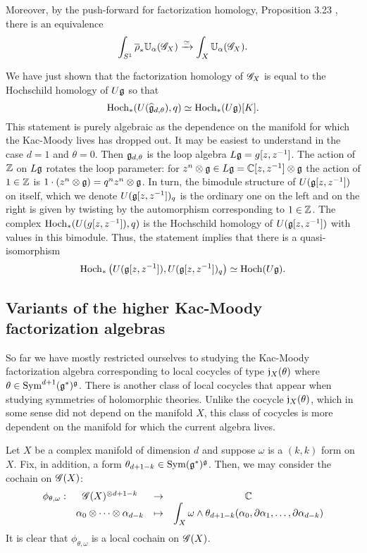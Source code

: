 \documentclass[10pt]{amsart}
\begin{document}
Moreover, by the push-forward for factorization homology, Proposition 3.23 \cite{AFTopMan}, there is an equivalence
\[
\int_{S^1} \overline{\rho}_* \mathbb U_\alpha(\mathscr G_X) \xrightarrow{\simeq} \int_X \mathbb U_{\alpha} (\mathscr G_X) .
\]

We have just shown that the factorization homology of $\mathscr G_X$ is equal to the Hochschild homology of $U\mathfrak g$ so that
\[
{\rm Hoch}_*(U(\widehat{\mathfrak g}_{d,\theta}), q) \simeq {\rm Hoch}_* (U\mathfrak g)[K] .
\]
This statement is purely algebraic as the dependence on the manifold for which the Kac-Moody lives has dropped out.
It may be easiest to understand in the case $d=1$ and $\theta = 0$. 
Then $\mathfrak g_{d,\theta}$ is the loop algebra $L\mathfrak g = g [z,z^{-1}]$. 
The action of $\mathbb Z$ on $L\mathfrak g$ rotates the loop parameter: for $z^n \otimes \mathfrak g \in L \mathfrak g = \mathbb C[z,z^{-1}] \otimes \mathfrak g$ the action of $1 \in \mathbb Z$ is $1 \cdot (z^n \otimes \mathfrak g) = q^n z^n \otimes \mathfrak g$. 
In turn, the bimodule structure of $U(\mathfrak g[z,z^{-1}])$ on itself, which we denote $U(\mathfrak g[z,z^{-1}])_q$ is the ordinary one on the left and on the right is given by twisting by the automorphism corresponding to $1 \in \mathbb Z$. 
The complex ${\rm Hoch}_*(U(g[z,z^{-1}]), q)$ is the Hochschild homology of $U(\mathfrak g[z,z^{-1}])$ with values in this bimodule.
Thus, the statement implies that there is a quasi-isomorphism
\[
{\rm Hoch}_*\left(U(\mathfrak g[z,z^{-1}]), U(\mathfrak g[z,z^{-1}])_q \right) \simeq {\rm Hoch}(U \mathfrak g) . 
\]

\subsection{Variants of the higher Kac-Moody factorization algebras}

So far we have mostly restricted ourselves to studying the Kac-Moody factorization algebra corresponding to local cocycles of type $\mathfrak j_X(\theta)$ where $\theta \in {\rm Sym}^{d+1}(\mathfrak g^*)^\mathfrak g$.
There is another class of local cocycles that appear when studying symmetries of holomorphic theories. 
Unlike the cocycle $\mathfrak j_X(\theta)$, which in some sense did not depend on the manifold $X$, this class of cocycles is more dependent on the manifold for which the current algebra lives.

Let $X$ be a complex manifold of dimension $d$ and suppose $\omega$ is a $(k,k)$ form on $X$. 
Fix, in addition, a form $\theta_{d+1-k} \in {\rm Sym}(\mathfrak g^*)^\mathfrak g$.
Then, we may consider the cochain on $\mathscr G(X)$:
\[
\begin{array}{cccc}
\displaystyle \phi_{\theta, \omega} : & \mathscr G(X)^{\otimes d + 1 - k} & \to & \mathbb C \\
\displaystyle & \alpha_0 \otimes\cdots \otimes \alpha_{d-k} & \mapsto & \displaystyle \int_X \omega \wedge \theta_{d+1-k}(\alpha_0, \partial\alpha_1,\ldots,\partial \alpha_{d-k})
\end{array}
\]
It is clear that $\phi_{\theta,\omega}$ is a local cochain on $\mathscr G(X)$. 
\end{document}
